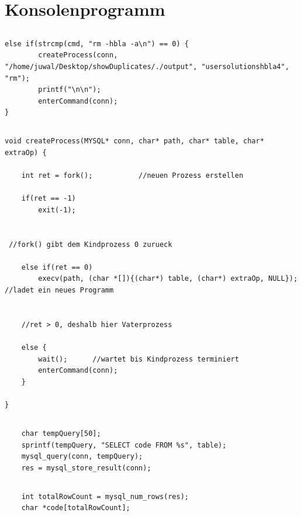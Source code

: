\documentclass[12pt]{report}
\begin{document}
\section{Konsolenprogramm}

\subsection{}

\begin{lstlisting}
else if(strcmp(cmd, "rm -hbla -a\n") == 0) {
        createProcess(conn, "/home/juwal/Desktop/showDuplicates/./output", "usersolutionshbla4", "rm");
        printf("\n\n");
        enterCommand(conn);
}
\end{lstlisting}


\subsection{}
\begin{lstlisting}
void createProcess(MYSQL* conn, char* path, char* table, char* extraOp) {

    int ret = fork();           //neuen Prozess erstellen

    if(ret == -1)
        exit(-1);
    

 //fork() gibt dem Kindprozess 0 zurueck

    else if(ret == 0)
        execv(path, (char *[]){(char*) table, (char*) extraOp, NULL});       //ladet ein neues Programm


    //ret > 0, deshalb hier Vaterprozess

    else {
        wait();      //wartet bis Kindprozess terminiert
        enterCommand(conn);
    }

}
\end{lstlisting}


\subsection{}
\begin{lstlisting}
    char tempQuery[50];
    sprintf(tempQuery, "SELECT code FROM %s", table);
    mysql_query(conn, tempQuery);
    res = mysql_store_result(conn);
\end{lstlisting}


\subsection{}
\begin{lstlisting}
    int totalRowCount = mysql_num_rows(res);
    char *code[totalRowCount];
\end{lstlisting}
\end{document}
